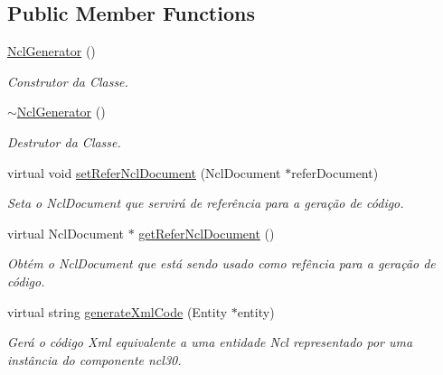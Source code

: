 \subsection*{Public Member Functions}
\begin{DoxyCompactItemize}
\item 
\hyperlink{classbr_1_1ufscar_1_1lince_1_1ncl_1_1generator_1_1NclGenerator_a364caf2d15d48ca7f2d903a514134542}{NclGenerator} ()
\begin{DoxyCompactList}\small\item\em Construtor da Classe. \item\end{DoxyCompactList}\item 
\hyperlink{classbr_1_1ufscar_1_1lince_1_1ncl_1_1generator_1_1NclGenerator_a95e37288a7d455edd79d9eb95bb3e733}{$\sim$NclGenerator} ()
\begin{DoxyCompactList}\small\item\em Destrutor da Classe. \item\end{DoxyCompactList}\item 
virtual void \hyperlink{classbr_1_1ufscar_1_1lince_1_1ncl_1_1generator_1_1NclGenerator_aad4936354267258229fb526a070e5482}{setReferNclDocument} (NclDocument $\ast$referDocument)
\begin{DoxyCompactList}\small\item\em Seta o NclDocument que servirá de referência para a geração de código. \item\end{DoxyCompactList}\item 
virtual NclDocument $\ast$ \hyperlink{classbr_1_1ufscar_1_1lince_1_1ncl_1_1generator_1_1NclGenerator_ab8447127e8b36e07f83995e4a0867596}{getReferNclDocument} ()
\begin{DoxyCompactList}\small\item\em Obtém o NclDocument que está sendo usado como refência para a geração de código. \item\end{DoxyCompactList}\item 
virtual string \hyperlink{classbr_1_1ufscar_1_1lince_1_1ncl_1_1generator_1_1NclGenerator_a59b182d92c713dce65071b9a9c391c5f}{generateXmlCode} (Entity $\ast$entity)
\begin{DoxyCompactList}\small\item\em Gerá o código Xml equivalente a uma entidade Ncl representado por uma instância do componente ncl30. \item\end{DoxyCompactList}\item 

\end{DoxyCompactItemize}
